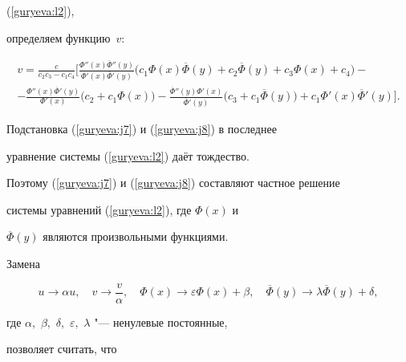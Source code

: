 (\ref{guryeva:l2}),


определяем функцию~$v$:


\begin{multline}


 \label{guryeva:j8}


v= \frac{c}{c_{2}c_{3}-c_{1}c_{4}}


\bigg[ \frac{\Phi''(x) \overline{\Phi}''(y)}{\Phi'(x)\overline{\Phi}'(y)}


\bigl( c_{1}\Phi(x)\overline{\Phi}(y)+c_{2}\overline{\Phi}(y)


+c_{3}\Phi(x)+   c_{4} \bigr)-


 \\


-  \frac{\Phi''(x) \overline{\Phi}'(y)}{\Phi'(x)}\bigl(c_{2}+c_{1}\Phi(x)\bigr)-


\frac{\overline{\Phi}''(y) \Phi' (x)}{\overline{\Phi}'(y)}\bigl(c_{3}+ c_{1}\overline{\Phi}(y)\bigr)  +  c_{1}\Phi'(x)


\overline{\Phi}'(y)\bigg].


\end{multline}





Подстановка (\ref{guryeva:j7}) и (\ref{guryeva:j8}) в последнее


уравнение системы (\ref{guryeva:l2}) даёт тождество.


Поэтому (\ref{guryeva:j7}) и (\ref{guryeva:j8}) составляют частное решение


системы уравнений (\ref{guryeva:l2}), где $\Phi(x)$ и


$\overline{\Phi}(y)$ являются произвольными функциями.








Замена


$$


u\rightarrow \alpha u, \quad v \rightarrow


 \frac{v}{\alpha}, \quad \Phi(x) \rightarrow


\varepsilon\Phi(x)+\beta, \quad \overline{\Phi}(y)\rightarrow


\lambda\overline{\Phi}(y) + \delta,


$$


где $\alpha,$ $ \beta,$ $\delta,$ $ \varepsilon,$ $ \lambda $ "--- ненулевые постоянные,


позволяет считать, что


